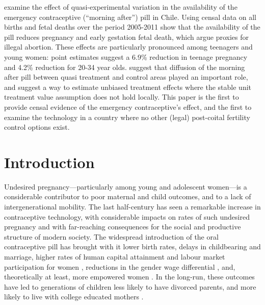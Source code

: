 \vspace{-5mm}
\begin{chapabstract}
\Person examine the effect of quasi-experimental variation in the availability
of the emergency contraceptive (``morning after'') pill in Chile.  Using censal
data on all births and fetal deaths over the period 2005-2011 \person show that
the availability of the pill reduces pregnancy and early gestation fetal death,
which \person argue proxies for illegal abortion.  These effects are 
particularly pronounced among teenagers and young women: point estimates suggest
a 6.9\% reduction in teenage pregnancy and 4.2\% reduction for 20-34 year olds.   
\Person suggest that diffusion of the morning after pill between quasi treatment 
and control areas played an important role, and suggest a way to estimate 
unbiased treatment effects where the stable unit treatment value assumption does 
not hold locally.  This paper is the first to provide censal evidence of the
emergency contraceptive's effect, and the first to examine the technology in a
country where no other (legal) post-coital fertility control options exist. \\
\JELs
\end{chapabstract}

\section{Introduction}
Undesired pregnancy---particularly among young and adolescent women---is a
considerable contributor to poor maternal and child outcomes, and to a lack of
intergenerational mobility.  The last half-century has seen a remarkable 
increase in contraceptive technology, with considerable impacts on rates of such
undesired pregnancy and with far-reaching consequences for the social and 
productive structure of modern society. The widespread introduction of the oral 
contraceptive pill has brought with it lower birth rates, delays in childbearing 
and marriage, higher rates of human capital attainment and labour market 
participation for women \citep{AngristEvans1996,Bailey2006,GoldinKatz2002a,
GoldinKatz2002b}, reductions in the gender wage differential 
\citep{Baileyetal2012}, and, theoretically at least, more empowered women 
\citep{ChiapporiOreffice2008}.  In the long-run, these outcomes have led to 
generations of children less likely to have divorced parents, and more likely to 
live with college educated mothers \citep{OltmansHungerman2012}.

